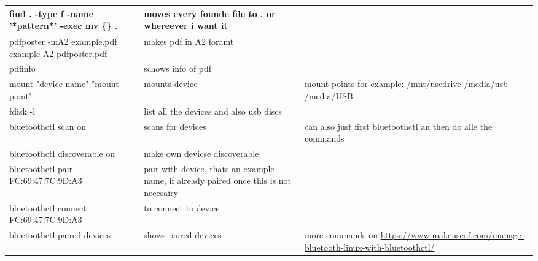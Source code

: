 \documentclass[12pt]{article}
\begin{document}
\begin{tabular}{| p{6.5cm} | p{6.5cm} | p{6.5cm} |}
    \hline
    find . -type f -name '*pattern*' -exec mv \{\} . \; & moves every founde file to . or whereever i want it &\\
    \hline 
    pdfposter -mA2 example.pdf example-A2-pdfposter.pdf & makes pdf in A2 foramt &\\
    \hline
    pdfinfo & schows info of pdf & \\
    \hline
    mount "device name" "mount point" & mounts device & mount points for example: /mnt/usedrive /media/usb /media/USB \\
    \hline
    fdisk -l & list all the devices and also usb discs & \\
    \hline 
    bluetoothctl scan on & scans for devices & can also just first bluetoothctl an then do alle the commands \\
    \hline 
    bluetoothctl discoverable on & make own devicse discoverable & \\
    \hline 
    bluetoothctl pair FC:69:47:7C:9D:A3 & pair with device, thats an example name, if already paired once this is not necesairy & \\
    \hline 
    bluetoothctl connect FC:69:47:7C:9D:A3 & to connect to device & \\
    \hline
    bluetoothctl paired-devices & shows paired devices &  more commands on \url{https://www.makeuseof.com/manage-bluetooth-linux-with-bluetoothctl/}\\
    \hline 
\end{tabular}


\newpage
\end{document}
